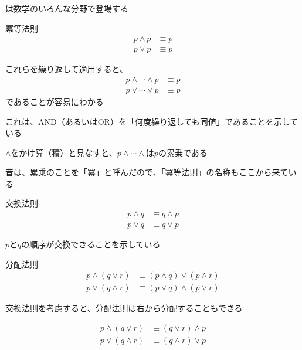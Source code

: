 \documentclass[b5paper,12pt]{jsarticle}
\begin{document}
は数学のいろんな分野で登場する

\sectionline

\begin{theorem}{冪等法則}
  \begin{align*}
    p \land p & \equiv p \\
    p \lor p  & \equiv p
  \end{align*}
\end{theorem}

これらを繰り返して適用すると、
\begin{align*}
  p \land \cdots \land p & \equiv p \\
  p \lor \cdots \lor p   & \equiv p
\end{align*}
であることが容易にわかる

これは、AND（あるいはOR）を「何度繰り返しても同値」であることを示している

\br

$\land$をかけ算（積）と見なすと、$  p \land \cdots \land$は$p$の累乗である

昔は、累乗のことを「冪」と呼んだので、「冪等法則」の名称もここから来ている

\sectionline

\begin{theorem}{交換法則}
  \begin{align*}
    p \land q & \equiv q \land p \\
    p \lor q  & \equiv q \lor p
  \end{align*}
\end{theorem}

$p$と$q$の順序が交換できることを示している

\sectionline

\begin{theorem}{分配法則}
  \begin{align*}
    p \land (q \lor r) & \equiv (p \land q) \lor (p \land r) \\
    p \lor (q \land r) & \equiv (p \lor q) \land (p \lor r)
  \end{align*}
\end{theorem}

交換法則を考慮すると、分配法則は右から分配することもできる

\begin{align*}
  p \land (q \lor r) & \equiv (q \lor r) \land p \\
  p \lor (q \land r) & \equiv (q \land r) \lor p
\end{align*}
\end{document}
